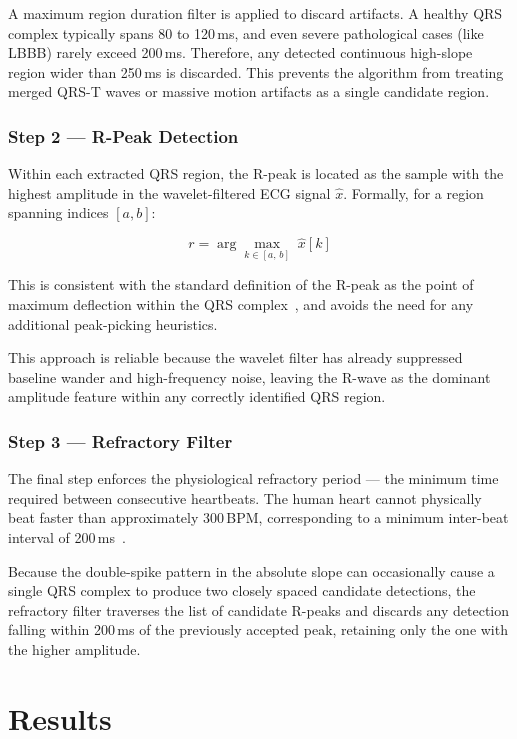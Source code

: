 \documentclass[11pt]{article}
\begin{document}
A maximum region duration filter is applied to discard artifacts. A healthy QRS complex typically spans 80 to 120\,ms, and even severe pathological cases (like LBBB) rarely exceed 200\,ms. Therefore, any detected continuous high-slope region wider than 250\,ms is discarded. This prevents the algorithm from treating merged QRS-T waves or massive motion artifacts as a single candidate region.


\subsubsection*{Step 2 — R-Peak Detection}
Within each extracted QRS region, the R-peak is located as the sample with the highest amplitude in the wavelet-filtered ECG signal $\hat{x}$. Formally, for a region spanning indices $[a, b]$:

$$r = \arg\max_{k \in [a,\, b]}\; \hat{x}[k]$$

This is consistent with the standard definition of the R-peak as the point of maximum deflection within the QRS complex~\cite{dogan_comprehensive_2023}, and avoids the need for any additional peak-picking heuristics.

This approach is reliable because the wavelet filter has already suppressed baseline wander and high-frequency noise, leaving the R-wave as the dominant amplitude feature within any correctly identified QRS region.


\subsubsection*{Step 3 — Refractory Filter}
The final step enforces the physiological refractory period — the minimum time required between consecutive heartbeats. The human heart cannot physically beat faster than approximately 300\,BPM, corresponding to a minimum inter-beat interval of 200\,ms~\cite{pan_real-time_1985}. 

Because the double-spike pattern in the absolute slope can occasionally cause a single QRS complex to produce two closely spaced candidate detections, the refractory filter traverses the list of candidate R-peaks and discards any detection falling within 200\,ms of the previously accepted peak, retaining only the one with the higher amplitude.


\section{Results}\label{sec:results}
\end{document}
